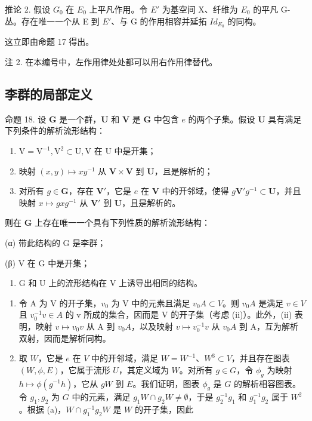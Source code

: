 推论 2. 假设 \(G_{0}\) 在 \(E_{0}\) 上平凡作用。令 \(E'\) 为基空间 X、纤维为 \(E_{0}\) 的平凡 G-丛。存在唯一一个从 E 到 \(E'\)、与 G 的作用相容并延拓 \(Id_{E_{0}}\) 的同构。

这立即由命题 17 得出。

注 2. 在本编号中，左作用律处处都可以用右作用律替代。

\subsection{李群的局部定义}

命题 18. 设 \(\mathbf{G}\) 是一个群，\(\mathbf{U}\) 和 \(\mathbf{V}\) 是 \(\mathbf{G}\) 中包含 \(e\) 的两个子集。假设 \(\mathbf{U}\) 具有满足下列条件的解析流形结构：

\begin{enumerate}
\def\labelenumi{(\roman{enumi})}
\item
  \(\mathrm{V} = \mathrm{V}^{-1},\mathrm{V}^2\subset \mathrm{U},\mathrm{V}\) 在 U 中是开集；
\item
  映射 \((x,y)\mapsto xy^{-1}\) 从 \(\mathbf{V}\times \mathbf{V}\) 到 \(\mathbf{U}\)，且是解析的；
\item
  对所有 \(g \in \mathbf{G}\)，存在 \(\mathbf{V}'\)，它是 \(e\) 在 \(\mathbf{V}\) 中的开邻域，使得 \(g\mathbf{V}'g^{-1} \subset \mathbf{U}\)，并且映射 \(x \mapsto gxg^{-1}\) 从 \(\mathbf{V}'\) 到 \(\mathbf{U}\)，且是解析的。
\end{enumerate}

则在 \(\mathbf{G}\) 上存在唯一一个具有下列性质的解析流形结构：

(α) 带此结构的 G 是李群；

(β) V 在 G 中是开集；

\begin{enumerate}
\def\labelenumi{(\Alph{enumi})}
\setcounter{enumi}{24}
\tightlist
\item
  G 和 U 上的流形结构在 V 上诱导出相同的结构。
\end{enumerate}

\begin{enumerate}
\def\labelenumi{(\alph{enumi})}
\item
  令 A 为 V 的开子集，\(v_{0}\) 为 V 中的元素且满足 \(v_{0}A \subset V\)。则 \(v_{0}A\) 是满足 \(v \in V\) 且 \(v_{0}^{-1}v \in A\) 的 v 所成的集合，因而是 V 的开子集（考虑 (ii)）。此外，(ii) 表明，映射 \(v \mapsto v_{0}v\) 从 A 到 \(v_{0}A\)，以及映射 \(v \mapsto v_{0}^{-1}v\) 从 \(v_{0}A\) 到 A，互为解析双射，因而是解析同构。
\item
  取 \(W\)，它是 \(e\) 在 \(V\) 中的开邻域，满足 \(W = W^{-1}\)、\(W^3 \subset V\)，并且存在图表 \((W, \phi, E)\)，它属于流形 \(U\)，其定义域为 \(W\)。对所有 \(g \in G\)，令 \(\phi_g\) 为映射 \(h \mapsto \phi(g^{-1}h)\)，它从 \(gW\) 到 \(E\)。我们证明，图表 \(\phi_g\) 是 \(G\) 的解析相容图表。令 \(g_1, g_2\) 为 \(G\) 中的元素，满足 \(g_1W \cap g_2W \neq \emptyset\)，于是 \(g_2^{-1}g_1\) 和 \(g_1^{-1}g_2\) 属于 \(W^2\)。根据 (a)，\(W \cap g_1^{-1}g_2W\) 是 \(W\) 的开子集，因此
\end{enumerate}

